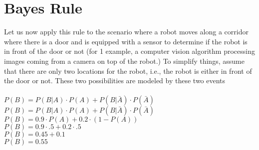\documentclass[12pt,letterpaper]{article}
\begin{document}
\section{Bayes Rule}
Let us now apply this rule to the scenario where a robot moves along a corridor where there is a door and is equipped with a sensor to determine if the robot is in front of the door or not (for 1 example, a computer vision algorithm processing images coming from a camera on top of the robot.) To simplify things, assume that there are only two locations for the robot, i.e., the robot is either in front of the door or not. These two possibilities are modeled by these two events
\\
\\
$P(B) = P(B\vert A)\cdot P(A) + P(B\vert\bar{A}) \cdot P(\bar{A}) $
\\
$P(B) = P(B\vert A)\cdot P(A) + P(B\vert\bar{A}) \cdot P(\bar{A}) $
\\
$P(B) = 0.9 \cdot P(A) + 0.2 \cdot (1 - P({A})) $
\\
$P(B) = 0.9 \cdot .5 + 0.2 \cdot .5 $
\\
$P(B) = 0.45 + 0.1$
\\
$P(B) = 0.55$
\end{document}

